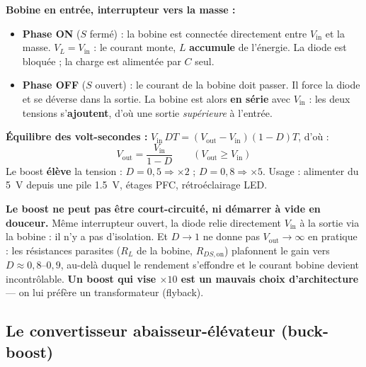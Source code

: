 \documentclass[12pt,a4paper,twoside]{book}
\begin{document}
\begin{formule}
\textbf{Bobine en entrée, interrupteur vers la masse :}
\begin{itemize}[nosep]
\item \textbf{Phase ON} ($S$ fermé) : la bobine est connectée directement entre $V_{\text{in}}$ et la masse. $V_L = V_{\text{in}}$ : le courant monte, $L$ \textbf{accumule} de l'énergie. La diode est bloquée ; la charge est alimentée par $C$ seul.
\item \textbf{Phase OFF} ($S$ ouvert) : le courant de la bobine doit passer. Il force la diode et se déverse dans la sortie. La bobine est alors \textbf{en série} avec $V_{\text{in}}$ : les deux tensions s'\textbf{ajoutent}, d'où une sortie \textit{supérieure} à l'entrée.
\end{itemize}

\textbf{Équilibre des volt-secondes :} $V_{\text{in}}\,DT = (V_{\text{out}} - V_{\text{in}})(1-D)T$, d'où :
\[
\boxed{V_{\text{out}} = \frac{V_{\text{in}}}{1 - D} \qquad (V_{\text{out}} \geq V_{\text{in}})}
\]
Le boost \textbf{élève} la tension : $D = 0{,}5 \Rightarrow \times 2$ ; $D = 0{,}8 \Rightarrow \times 5$. Usage : alimenter du \SI{5}{V} depuis une pile \SI{1.5}{V}, étages PFC, rétroéclairage LED.
\end{formule}

\begin{attention}
\textbf{Le boost ne peut pas être court-circuité, ni démarrer à vide en douceur.} Même interrupteur ouvert, la diode relie directement $V_{\text{in}}$ à la sortie via la bobine : il n'y a pas d'isolation. Et $D \to 1$ ne donne pas $V_{\text{out}} \to \infty$ en pratique : les résistances parasites ($R_L$ de la bobine, $R_{DS,\text{on}}$) plafonnent le gain vers $D \approx 0{,}8$--$0{,}9$, au-delà duquel le rendement s'effondre et le courant bobine devient incontrôlable. \textbf{Un boost qui vise $\times 10$ est un mauvais choix d'architecture} --- on lui préfère un transformateur (flyback).
\end{attention}

\subsection{Le convertisseur abaisseur-élévateur (buck-boost)}
\end{document}
